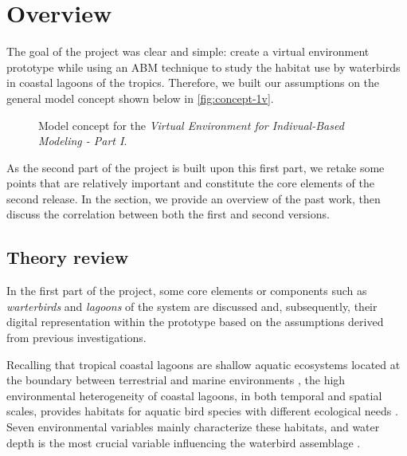 %
%
%


\section{Overview}\label{sec:overview}
The goal of the  project was clear and simple: create a virtual environment prototype while using an ABM technique to study the habitat use by waterbirds in coastal lagoons of the tropics. Therefore, we built our assumptions on the general model concept shown below in \autoref{fig:concept-1v}.

\begin{figure}[!ht]
    \centering
    \caption{Model concept for the \emph{Virtual Environment for Indivual-Based Modeling - Part I}.}
    \label{fig:concept-1v}
\end{figure}

As the second part of the project is built upon this first part, we retake some points that are relatively important and constitute the core elements of the second release. In the section, we provide an overview of the past work, then discuss the correlation between both the first and second versions.

\subsection{Theory review}
In the first part of the project, some core elements or components such as  \emph{warterbirds} and \emph{lagoons} of the system are discussed and, subsequently, their digital representation within the prototype based on the assumptions derived from previous investigations.

Recalling that tropical coastal lagoons are shallow aquatic ecosystems located at the boundary between terrestrial and marine environments \cite{tavares2015environmental}, the high environmental heterogeneity of coastal lagoons, in both temporal and spatial scales, provides habitats for aquatic bird species with different ecological needs \cite{ntiamoa1998water, paracuellos2004factors, tavares2013inventory}. Seven environmental variables mainly characterize these habitats, and water depth is the most crucial variable influencing the waterbird assemblage \cite{tavares2015environmental}.

